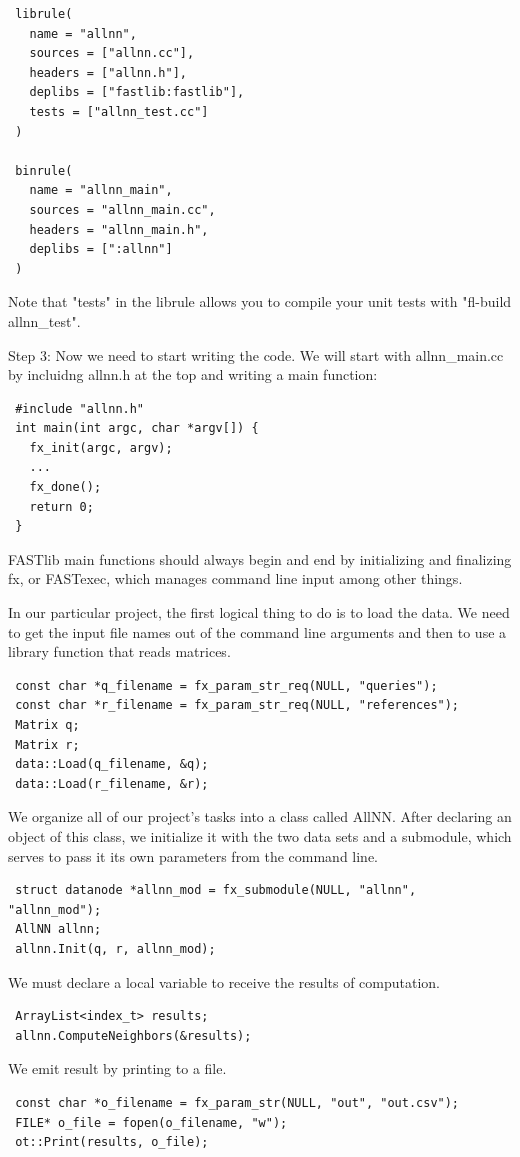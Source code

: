 \documentclass[letter]{report}
\begin{document}
\begin{verbatim}
 librule(
   name = "allnn",
   sources = ["allnn.cc"],
   headers = ["allnn.h"],
   deplibs = ["fastlib:fastlib"],
   tests = ["allnn_test.cc"]
 )

 binrule(
   name = "allnn_main",
   sources = "allnn_main.cc",
   headers = "allnn_main.h",
   deplibs = [":allnn"]
 )
\end{verbatim}

Note that "tests" in the librule allows you to compile your unit tests with "fl-build allnn\_test". 

Step 3: Now we need to start writing the code. We will start with allnn\_main.cc by incluidng allnn.h at the top and writing a main function: 

\begin{verbatim}
 #include "allnn.h"
 int main(int argc, char *argv[]) {
   fx_init(argc, argv);
   ...
   fx_done();
   return 0;
 }
\end{verbatim}

FASTlib main functions should always begin and end by initializing and finalizing fx, or FASTexec, which manages command line input among other things. 

In our particular project, the first logical thing to do is to load the data. We need to get the input file names out of the command line arguments and then to use a library function that reads matrices. 

\begin{verbatim}
 const char *q_filename = fx_param_str_req(NULL, "queries");
 const char *r_filename = fx_param_str_req(NULL, "references");
 Matrix q;
 Matrix r;
 data::Load(q_filename, &q);
 data::Load(r_filename, &r);
\end{verbatim}

We organize all of our project's tasks into a class called AllNN. After declaring an object of this class, we initialize it with the two data sets and a submodule, which serves to pass it its own parameters from the command line. 

\begin{verbatim}
 struct datanode *allnn_mod = fx_submodule(NULL, "allnn", "allnn_mod");
 AllNN allnn;
 allnn.Init(q, r, allnn_mod);
\end{verbatim}
We must declare a local variable to receive the results of computation. 
\begin{verbatim}
 ArrayList<index_t> results;
 allnn.ComputeNeighbors(&results);
\end{verbatim}
We emit result by printing to a file. 
\begin{verbatim}
 const char *o_filename = fx_param_str(NULL, "out", "out.csv");
 FILE* o_file = fopen(o_filename, "w");
 ot::Print(results, o_file);
\end{verbatim}
\end{document}
